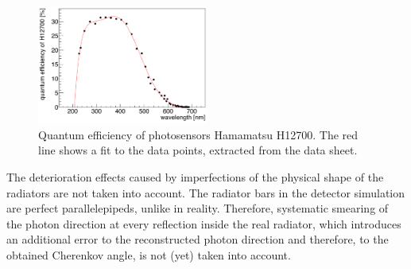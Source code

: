 \begin{figure}[tb]
\centering
\includegraphics[width=0.5\textwidth]{pics/qe.png}
\caption{\label{pic:qe}
Quantum efficiency of photosensors Hamamatsu H12700. The red line shows a fit to the data points, extracted from the data sheet.
}
\end{figure}

The deterioration effects caused by imperfections of the physical shape of the radiators are not taken into account. The radiator bars in the detector simulation are perfect parallelepipeds, unlike in reality. Therefore, systematic smearing of the photon direction at every reflection inside the real radiator, which introduces an additional error to the reconstructed photon direction and therefore, to the obtained Cherenkov angle, is not (yet) taken into account.
